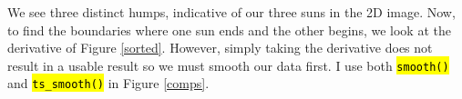 \documentclass[10pt]{scrartcl}
\begin{document}
We see three distinct humps, indicative of our three suns in the 2D image. Now, to find the boundaries where one sun ends and the other begins, we look at the derivative of Figure \ref{sorted}. However, simply taking the derivative does not result in a usable result so we must smooth our data first. I use both \texttt{\hl{smooth()}} and \texttt{\hl{ts\_smooth()}} in Figure \ref{comps}.

\begin{figure}[!ht]



\end{figure}
\end{document}
